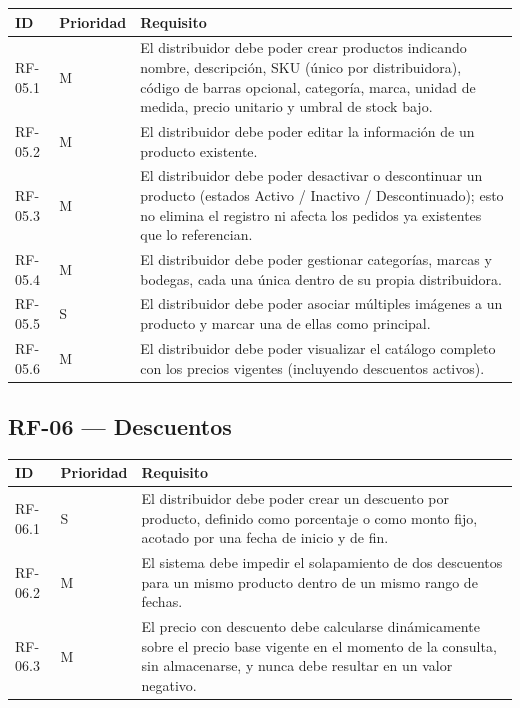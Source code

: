 \documentclass[12pt,a4paper]{report}
\begin{document}
\begin{longtable}{|p{2cm}|p{2cm}|p{10cm}|}
\hline
\textbf{ID} & \textbf{Prioridad} & \textbf{Requisito} \\ \hline
RF-05.1 & M & El distribuidor debe poder crear productos indicando nombre, descripción, SKU (único por distribuidora), código de barras opcional, categoría, marca, unidad de medida, precio unitario y umbral de stock bajo. \\ \hline
RF-05.2 & M & El distribuidor debe poder editar la información de un producto existente. \\ \hline
RF-05.3 & M & El distribuidor debe poder desactivar o descontinuar un producto (estados Activo / Inactivo / Descontinuado); esto no elimina el registro ni afecta los pedidos ya existentes que lo referencian. \\ \hline
RF-05.4 & M & El distribuidor debe poder gestionar categorías, marcas y bodegas, cada una única dentro de su propia distribuidora. \\ \hline
RF-05.5 & S & El distribuidor debe poder asociar múltiples imágenes a un producto y marcar una de ellas como principal. \\ \hline
RF-05.6 & M & El distribuidor debe poder visualizar el catálogo completo con los precios vigentes (incluyendo descuentos activos). \\ \hline
\end{longtable}

\subsection{RF-06 --- Descuentos}

\begin{longtable}{|p{2cm}|p{2cm}|p{10cm}|}
\hline
\textbf{ID} & \textbf{Prioridad} & \textbf{Requisito} \\ \hline
RF-06.1 & S & El distribuidor debe poder crear un descuento por producto, definido como porcentaje o como monto fijo, acotado por una fecha de inicio y de fin. \\ \hline
RF-06.2 & M & El sistema debe impedir el solapamiento de dos descuentos para un mismo producto dentro de un mismo rango de fechas. \\ \hline
RF-06.3 & M & El precio con descuento debe calcularse dinámicamente sobre el precio base vigente en el momento de la consulta, sin almacenarse, y nunca debe resultar en un valor negativo. \\ \hline
\end{longtable}
\end{document}
